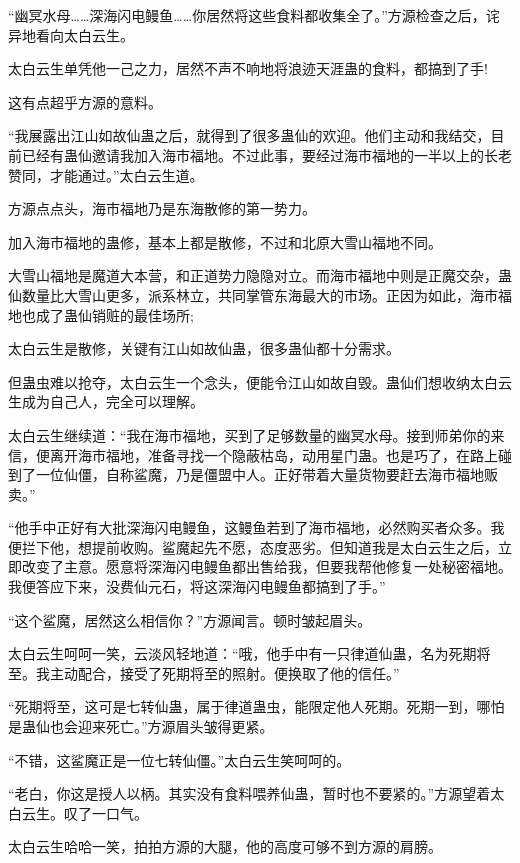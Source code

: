 
\begin{this_body}

“幽冥水母……深海闪电鳗鱼……你居然将这些食料都收集全了。”方源检查之后，诧异地看向太白云生。

太白云生单凭他一己之力，居然不声不响地将浪迹天涯蛊的食料，都搞到了手!

这有点超乎方源的意料。

“我展露出江山如故仙蛊之后，就得到了很多蛊仙的欢迎。他们主动和我结交，目前已经有蛊仙邀请我加入海市福地。不过此事，要经过海市福地的一半以上的长老赞同，才能通过。”太白云生道。

方源点点头，海市福地乃是东海散修的第一势力。

加入海市福地的蛊修，基本上都是散修，不过和北原大雪山福地不同。

大雪山福地是魔道大本营，和正道势力隐隐对立。而海市福地中则是正魔交杂，蛊仙数量比大雪山更多，派系林立，共同掌管东海最大的市场。正因为如此，海市福地也成了蛊仙销赃的最佳场所;

太白云生是散修，关键有江山如故仙蛊，很多蛊仙都十分需求。

但蛊虫难以抢夺，太白云生一个念头，便能令江山如故自毁。蛊仙们想收纳太白云生成为自己人，完全可以理解。

太白云生继续道：“我在海市福地，买到了足够数量的幽冥水母。接到师弟你的来信，便离开海市福地，准备寻找一个隐蔽枯岛，动用星门蛊。也是巧了，在路上碰到了一位仙僵，自称鲨魔，乃是僵盟中人。正好带着大量货物要赶去海市福地贩卖。”

“他手中正好有大批深海闪电鳗鱼，这鳗鱼若到了海市福地，必然购买者众多。我便拦下他，想提前收购。鲨魔起先不愿，态度恶劣。但知道我是太白云生之后，立即改变了主意。愿意将深海闪电鳗鱼都出售给我，但要我帮他修复一处秘密福地。我便答应下来，没费仙元石，将这深海闪电鳗鱼都搞到了手。”

“这个鲨魔，居然这么相信你？”方源闻言。顿时皱起眉头。

太白云生呵呵一笑，云淡风轻地道：“哦，他手中有一只律道仙蛊，名为死期将至。我主动配合，接受了死期将至的照射。便换取了他的信任。”

“死期将至，这可是七转仙蛊，属于律道蛊虫，能限定他人死期。死期一到，哪怕是蛊仙也会迎来死亡。”方源眉头皱得更紧。

“不错，这鲨魔正是一位七转仙僵。”太白云生笑呵呵的。

“老白，你这是授人以柄。其实没有食料喂养仙蛊，暂时也不要紧的。”方源望着太白云生。叹了一口气。

太白云生哈哈一笑，拍拍方源的大腿，他的高度可够不到方源的肩膀。


\end{this_body}
